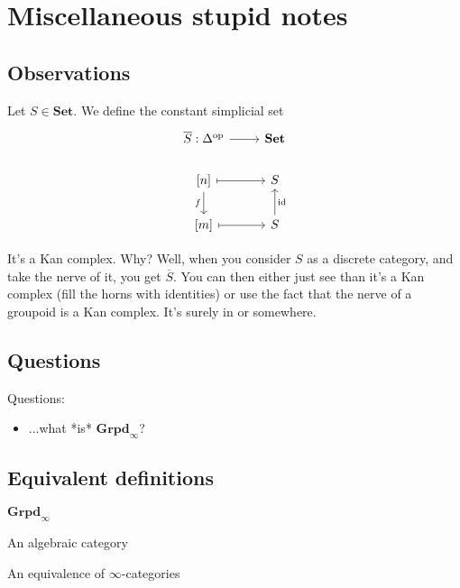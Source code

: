 \documentclass{MetricNotes2023}
\def\id{\ensuremath\text{id}}
\begin{document}
\begin{ourproof}
\end{ourproof}




\section{Miscellaneous stupid notes}

\subsection{Observations}

Let \(S \in \textbf{Set}\). We define the constant simplicial set 
\[\begin{tikzcd}
\overline{S} : \Delta^{\text{op}} \arrow[r, ""]  & \textbf{Set} \\
\left[n\right] \arrow[r, mapsto, swap, ""] \arrow[d, swap, "f"] & S\\
\left[m\right] \arrow[r, mapsto, swap, ""] & S \arrow[u, swap, "\id"]
\end{tikzcd}\]

It's a Kan complex. Why? Well, when you consider \(S\) as a discrete category, and take the nerve of it, you get \(\overline{S}\). You can then either just see than it's a Kan complex (fill the horns with identities) or use the fact that the nerve of a groupoid is a Kan complex. It's surely in \autocite{lurie2008higher} or \autocite{kerodon} somewhere. 

\subsection{Questions}

Questions:
\begin{itemize}
\item ...what *is* \(\textbf{Grpd}_\infty\)?
\end{itemize}

\subsection{Equivalent definitions}

\(\textbf{Grpd}_\infty\) 

An algebraic category

An equivalence of \(\infty\)-categories



\printbibliography
\end{document}
